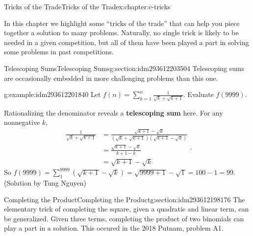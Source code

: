 \documentclass[twoside,10pt,]{book}
\newcommand{\terminology}[1]{\textbf{#1}}
\numberwithin{equation}{section}
\begin{document}
\begin{chapterptx}{Tricks of the Trade}{}{Tricks of the Trade}{}{}{x:chapter:c-tricks}
\begin{introduction}{}%
In this chapter we highlight some ``tricks of the trade'' that can help you piece together a solution to many problems.  Naturally, no single trick is likely to be needed in a given competition, but all of them have been played a part in solving some problems in past competitions.%
\end{introduction}%
%
%
\typeout{************************************************}
\typeout{************************************************}
%
\begin{sectionptx}{Telescoping Sums}{}{Telescoping Sums}{}{}{g:section:idm293612203504}
%
Telescoping sums are occasionally embedded in more challenging problems than this one.%
\begin{example}{}{g:example:idm293612201840}%
Let \(f(n)=\sum_{k=1}^n \frac{1}{\sqrt{k}+\sqrt{k+1}}\).  Evaluate \(f(9999)\).%
\par
Rationalizing the denominator reveals a \terminology{telescoping sum} here.  For any nonnegative \(k\),%
\begin{equation*}
\begin{split}
\frac{1}{\sqrt{k} + \sqrt{k + 1}} & = \frac{\sqrt{k + 1} - \sqrt{k}}{(\sqrt{k} + \sqrt{k + 1})(\sqrt{k + 1} - \sqrt{k})}\\ 
&= \frac{\sqrt{k + 1} - \sqrt{k}}{k + 1 - k}\\
&= \sqrt{k + 1} - \sqrt{k}
\end{split}\text{.}
\end{equation*}
So \(f(9999) = \sum_{1}^{9999}(\sqrt{k + 1} - \sqrt{k}) = \sqrt{9999 + 1} - \sqrt{1} = 100 - 1 = 99\).  (Solution by Tung Nguyen)%
\end{example}
\end{sectionptx}
%
%
\typeout{************************************************}
\typeout{************************************************}
%
\begin{sectionptx}{Completing the Product}{}{Completing the Product}{}{}{g:section:idm293612198176}
The elementary trick of completing the square, given a quadratic and linear term, can be generalized.  Given three terms, completing the product of two binomials can play a part in a solution.  This occured in the 2018 Putnam, problem A1.%
\begin{quote}%

\end{quote}
\end{sectionptx}
\end{chapterptx}
\end{document}
